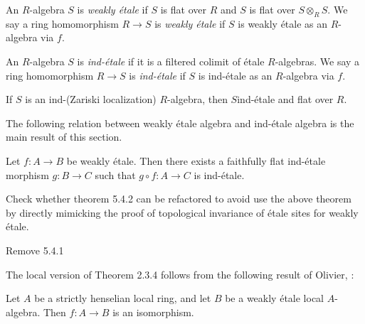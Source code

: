 \begin{definition}
    An $R$-algebra $S$ is \emph{weakly étale} if $S$ is flat over $R$ and
    $S$ is flat over $S \otimes_{R} S$. We say a ring homomorphism
    $R \to S$ is \emph{weakly étale} if $S$ is weakly étale as an $R$-algebra via $f$.
    \label{def:weakly-etale-algebra}
\end{definition}

\begin{definition}
    An $R$-algebra $S$ is \emph{ind-étale} if it is a filtered colimit of étale $R$-algebras.
    We say a ring homomorphism $R \to S$ is \emph{ind-étale} if $S$ is ind-étale as an $R$-algebra via $f$.
    \label{def:ind-etale-algebra}
\end{definition}

\begin{lemma}
    \label{lem:ind-etale-flat-of-ind-Zariski}

    If \(S\) is an ind-(Zariski localization) \(R\)-algebra, then \(S\)ind-étale and flat over \(R\).
\end{lemma}

The following relation between weakly étale algebra and ind-étale algebra is the main result of this section.
\begin{theorem}
Let $f: A \to B$ be weakly étale. Then there exists a faithfully flat ind-étale morphism $g: B \to C$ such that $g \circ f: A \to C$ is ind-étale.
    \label{thm:weakly-etale-ind-etale}
\end{theorem}

Check whether theorem 5.4.2 can be refactored to avoid use the above theorem by directly mimicking the proof of topological invariance of étale sites for weakly étale.

Remove 5.4.1



The local version of Theorem 2.3.4 follows from the following result of Olivier, \cite{Oli72}:

\begin{theorem}
Let $A$ be a strictly henselian local ring, and let $B$ be a weakly étale local $A$-algebra. Then $f: A \to B$ is an isomorphism.
    \label{thm:weakly-etale-local}
\end{theorem}


